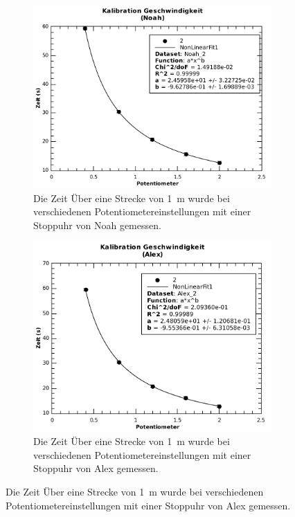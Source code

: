 \begin{figure}[H]
    \centering
    \begin{subfigure}{.7\textwidth}
        \includegraphics[width=\linewidth]{images/kalibration_geschwindigkeit_noah}
        \caption{Die Zeit \"Uber eine Strecke von \SI{1}{\meter} wurde bei verschiedenen Potentiometereinstellungen mit einer Stoppuhr von Noah gemessen.}
    \end{subfigure}
    \begin{subfigure}{.7\textwidth}
        \includegraphics[width=\linewidth]{images/kalibration_geschwindigkeit_alex}
        \caption{Die Zeit \"Uber eine Strecke von \SI{1}{\meter} wurde bei verschiedenen Potentiometereinstellungen mit einer Stoppuhr von Alex gemessen.}
    \end{subfigure}
\end{figure}

